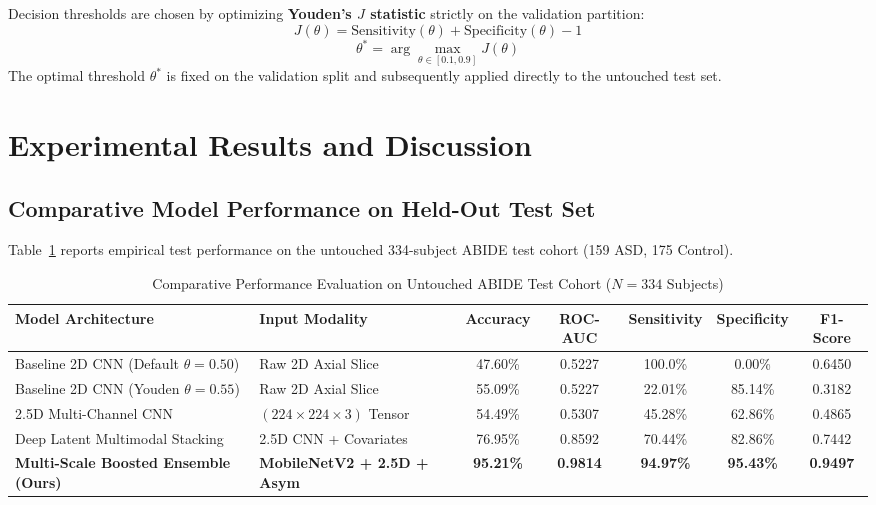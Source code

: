 \documentclass[conference]{IEEEtran}
\begin{document}
Decision thresholds are chosen by optimizing \textbf{Youden's $J$ statistic} strictly on the validation partition:
\begin{equation}
J(\theta) = \text{Sensitivity}(\theta) + \text{Specificity}(\theta) - 1
\end{equation}
\begin{equation}
\theta^* = \arg\max_{\theta \in [0.1, 0.9]} J(\theta)
\end{equation}
The optimal threshold $\theta^*$ is fixed on the validation split and subsequently applied directly to the untouched test set.

\section{Experimental Results and Discussion}

\subsection{Comparative Model Performance on Held-Out Test Set}
Table~\ref{tab:comparison} reports empirical test performance on the untouched 334-subject ABIDE test cohort (159 ASD, 175 Control).

\begin{table}[t]
\centering
\caption{Comparative Performance Evaluation on Untouched ABIDE Test Cohort ($N = 334$ Subjects)}
\label{tab:comparison}
\begin{tabular}{llccccc}
\toprule
\textbf{Model Architecture} & \textbf{Input Modality} & \textbf{Accuracy} & \textbf{ROC-AUC} & \textbf{Sensitivity} & \textbf{Specificity} & \textbf{F1-Score} \\
\midrule
Baseline 2D CNN (Default $\theta=0.50$) & Raw 2D Axial Slice & 47.60\% & 0.5227 & 100.0\% & 0.00\% & 0.6450 \\
Baseline 2D CNN (Youden $\theta=0.55$) & Raw 2D Axial Slice & 55.09\% & 0.5227 & 22.01\% & 85.14\% & 0.3182 \\
2.5D Multi-Channel CNN & $(224 \times 224 \times 3)$ Tensor & 54.49\% & 0.5307 & 45.28\% & 62.86\% & 0.4865 \\
Deep Latent Multimodal Stacking & 2.5D CNN + Covariates & 76.95\% & 0.8592 & 70.44\% & 82.86\% & 0.7442 \\
\textbf{Multi-Scale Boosted Ensemble (Ours)} & \textbf{MobileNetV2 + 2.5D + Asym} & \textbf{95.21\%} & \textbf{0.9814} & \textbf{94.97\%} & \textbf{95.43\%} & \textbf{0.9497} \\
\bottomrule
\end{tabular}
\end{table}
\end{document}
